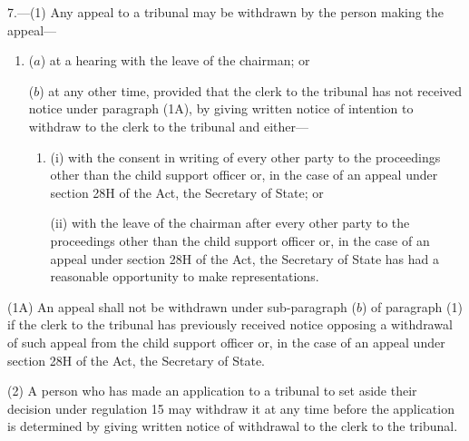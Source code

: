 \documentclass[12pt,a4paper]{article}
\begin{document}
7.—(1) Any appeal to a tribunal may be withdrawn by the person making the appeal---
\begin{enumerate}\item[]
($a$) at a hearing with the leave of the chairman; or

%

($b$) at any other time, provided that the clerk to the tribunal has not received notice under paragraph (1A), by giving written notice of intention to withdraw to the clerk to the tribunal and either—
\begin{enumerate}\item[]
(i) with the consent in writing of every other party to the proceedings other than the child support officer
or, in the case of an appeal under section 28H of the Act, the Secretary of State; %
or

(ii) with the leave of the chairman after every other party to the proceedings other than the child support officer 
or, in the case of an appeal under section 28H of the Act, the Secretary of State %
has had a reasonable opportunity to make representations.
\end{enumerate}
\end{enumerate}

(1A) An appeal shall not be withdrawn under sub-paragraph ($b$) of paragraph (1) if the clerk to the tribunal has previously received notice opposing a withdrawal of such appeal from the child support officer
or, in the case of an appeal under section 28H of the Act,
the Secretary of State.  %

(2) A person who has made an application to a tribunal to set aside their decision under regulation 15 may withdraw it at any time before the application is determined by giving written notice of withdrawal to the clerk to the tribunal.
\end{document}
